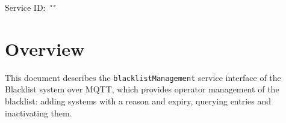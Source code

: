 \documentclass[a4paper]{arrowhead}
\begin{document}
\sloppy

\ArrowheadSetup

\begin{center}
  \vspace*{1cm}
  \huge{\arrowtitle}

  \vspace*{0.2cm}
  \LARGE{\arrowtype}
  \vspace*{1cm}

  \Large{Service ID: \textit{"\arrowid"}}

  \vspace*{\fill}


  \vspace*{1cm}
  \vspace*{\fill}

  \begin{abstract}
    This document describes the MQTT protocol with TLS payload security and JSON payload encoding variant of the \texttt{blacklist\allowbreak{}Management} service of the Blacklist system.
  \end{abstract}

  \vspace*{1cm}
\end{center}

\newpage

\tableofcontents
\newpage

\section{Overview}
\label{sec:overview}

This document describes the \texttt{blacklist\allowbreak{}Management} service interface of the Blacklist system over MQTT, which provides operator management of the blacklist: adding systems with a reason and expiry, querying entries and inactivating them.
\end{document}

